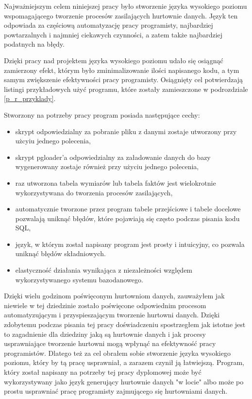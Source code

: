Najważniejszym celem niniejszej pracy było stworzenie języka wysokiego poziomu wspomagającego 
 tworzenie procesów zasilających hurtownie danych.
Język ten odpowiada za częściową automatyzację pracy programisty, najbardziej powtarzalnych i najmniej ciekawych 
czynności, a zatem także najbardziej podatnych na błędy.

Dzięki pracy nad projektem języka wysokiego poziomu udało się osiągnąć zamierzony efekt,
 którym było zminimalizowanie ilości napisanego kodu,
 a tym samym zwiększenie efektywności pracy programisty. 
Osiągnięty cel potwierdzają listingi przykładowych użyć programu,
 które zostały zamieszczone w podrozdziale \ref{p_r_przyklady}. 

Stworzony na potrzeby pracy program posiada następujące cechy:

\begin{itemize} 
\item skrypt odpowiedzialny za pobranie pliku z danymi zostaje utworzony przy użcyiu jednego polecenia,
\item skrypt pgloader'a odpowiedzialny za załadowanie danych do bazy wygenerowany zostaje również przy użyciu jednego polecenia,
\item raz utworzona tabela wymiarów lub tabela faktów jest wielokrotnie wykorzystywana do tworzenia procesów zasilających,
\item automatycznie tworzone przez program tabele przejściowe i tabele docelowe pozwalają uniknąć błędów, które pojawiają
      się często podczas pisania kodu SQL,
\item język, w którym został napisany program jest prosty i intuicyjny, co pozwala uniknąć błędów składniowych.
\item elastyczność działania wynikająca z niezależności względem wykorzystywanego systemu bazodanowego. 
\end{itemize}

Dzięki wielu godzinom poświęconym hurtowniom danych,
 zauważyłem jak niewiele w tej dziedzinie zostało poświęcone odpowiednim procesom
automatyzującym i przyspieszającym tworzenie hurtowni danych.
Dzięki zdobytemu podczas pisania tej pracy doświadczeniu spostrzegłem
 jak istotne jest to zagadnienie dla dziedziny jaką są hurtownie danych i jak procesy usprawniające tworzenie hurtowni mogą wpłynąć
 na efektywność pracy programistów.
Dlatego też za cel obrałem sobie stworzenie języka wysokiego poziomu, który by tą pracę usprawniał, 
a zarazem czynił ją łatwiejszą. Program, który został napisany na potrzeby tej pracy dyplomowej może być wykorzystywany 
jako język generujący hurtownie danych "w locie" albo może po prostu usprawniać pracę programisty zajmującego się hurtowniami danych.

